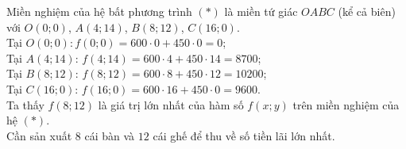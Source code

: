 \begin{bt}
{\begin{center}
	\end{center}
	Miền nghiệm của hệ bất phương trình $(*)$ là miền tứ giác $OABC$ (kể cả biên) với $O(0;0)$, $A(4;14)$, $B(8;12)$, $C(16;0)$.\\
	Tại $O(0;0): f(0;0)=600 \cdot 0 + 450 \cdot 0=0$;\\
	Tại $A(4;14)$: $f(4;14)=600 \cdot 4+450 \cdot 14=8700$; \\
	Tại $B(8;12)$: $f(8;12)=600 \cdot 8+450 \cdot 12=10200$;\\
	Tại $C(16;0)$: $f(16;0)=600 \cdot 16+450 \cdot 0=9600$.\\
	Ta thấy $f(8;12)$ là giá trị lớn nhất của hàm số $f(x;y)$ trên miền nghiệm của hệ $(*)$.\\
	Cần sản xuất $8$ cái bàn và $12$ cái ghế để thu về số tiền lãi lớn nhất.

	}
\end{bt}

